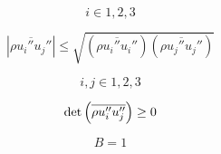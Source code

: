{\newpage\clearpage
{}%
\begin{displaymath}
i \in {1,2,3}
\end{displaymath}%
\lthtmldisplayZ
\lthtmlcheckvsize\clearpage}

{\newpage\clearpage
{}%
\begin{displaymath}
\left|\overline {\rho u_i'' u_j''}\right| \leq 
\sqrt{\left(\overline {\rho u_i'' u_i''}\right) \left(\overline {\rho u_j'' u_j''}\right)}
\end{displaymath}%
\lthtmldisplayZ
\lthtmlcheckvsize\clearpage}

{\newpage\clearpage
{}%
\begin{displaymath}
i,j \in {1,2,3}
\end{displaymath}%
\lthtmldisplayZ
\lthtmlcheckvsize\clearpage}

{\newpage\clearpage
{}%
\begin{displaymath}
{\rm det}\left(\overline {\rho u_i'' u_j''}\right) \geq 0
\end{displaymath}%
\lthtmldisplayZ
\lthtmlcheckvsize\clearpage}

{\newpage\clearpage
{}%
\begin{displaymath}
B=1
\end{displaymath}%
\lthtmldisplayZ
\lthtmlcheckvsize\clearpage}




